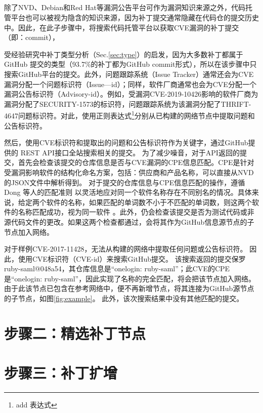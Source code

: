 \subsection{}
除了NVD、Debian和Red Hat等漏洞公告平台可作为漏洞知识来源之外，代码托管平台也可以被视为隐含的知识来源，因为补丁提交通常隐藏在代码仓的提交历史中。因此，在此子步骤中，\tool 将搜索代码托管平台以获取CVE漏洞的补丁提交（即：commit），

受经验研究中补丁类型分析（Sec.\ref{sec:type}）的启发，因为大多数补丁都属于 GitHub 提交的类型（93.7\%的补丁都为GitHub commit形式），所以在该步骤中\tool 只搜索GitHub平台的提交。此外，问题跟踪系统（Issue Tracker）通常还会为CVE漏洞分配一个问题标识符（Issue—id）；同样，软件厂商通常也会为CVE分配一个漏洞公告标识符（Advisory-id）。例如，受漏洞CVE-2019-10426影响的软件厂商为漏洞分配了SECURITY-1573\cite{SECURITY-1573}的标识符，问题跟踪系统为该漏洞分配了THRIFT-4647\cite{THRIFT-4647}问题标识符。对此，\tool 使用正则表达式\footnote{add 表达式}分别从已构建的网络节点中提取问题和公告标识符。

然后，\tool 使用CVE标识符和提取出的问题和公告标识符作为关键字，通过GitHub提供的 REST API\cite{github-api-1}接口全站搜索相关的提交。%
为了减少噪音，对于API返回的提交，\tool 首先会检查该提交的仓库信息是否与CVE漏洞的CPE信息匹配。CPE是针对受漏洞影响软件的结构化命名方案，包括：供应商和产品名称，可以直接从NVD的JSON文件中解析得到。
对于提交的仓库信息与CPE信息匹配的操作，\tool 遵循 Dong 等人的匹配准则 \cite{dong2019towards} 以灵活地应对同一个软件名称存在不同别名的情况。具体来说，给定两个软件的名称，如果匹配的单词数不小于不匹配的单词数，则这两个软件的名称匹配成功，视为同一软件 。此外，\tool 仍会检查该提交是否为测试代码或非源代码文件的更改。如果这两个检查都通过，\tool 会将其作为GitHub信息源节点的子节点加入网络。

\begin{exmp}
    对于样例CVE-2017-11428，\tool 无法从构建的网络中提取任何问题或公告标识符。 因此，\tool 使用CVE标识符（CVE-id）来搜索GitHub提交。 该搜索返回的提交保罗ruby-saml@048a54，其仓库信息是“onelogin: ruby-saml”；此CVE的CPE是“onelogin: ruby-saml”，因此实现了名称的完全匹配，\tool 将会把该节点加入网络。 由于此该节点已包含在参考网络中，\tool 便不再新增节点，将其连接为GitHub源节点的子节点，如图\ref{fig:example}。 此外，该次搜索结果中没有其他匹配的提交。
\end{exmp}   

\section{步骤二：精选补丁节点}

\section{步骤三：补丁扩增}
